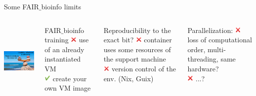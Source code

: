 \begin{frame}{Some FAIR$\_$bioinfo limits}
\begin{columns}
\begin{center}
    \includegraphics[height=3.8cm]{09_conclusion/images/FAIR_equilibre.png}
\end{center}
\begin{block}{FAIR$\_$bioinfo training}
\includegraphics[height=0.3cm]{05_history/Images/FAIR_no.png} use of an already instantiated VM\\
\includegraphics[height=0.3cm]{05_history/Images/FAIR_yes.png} create your own VM image
\end{block}
\begin{block}{Reproducibility to the exact bit?}
\includegraphics[height=0.3cm]{05_history/Images/FAIR_no.png} container uses some resources of the support machine\\
\includegraphics[height=0.3cm]{05_history/Images/FAIR_no.png} version control of the env. (Nix, Guix)
\end{block}
\begin{block}{Parallelization:}
\includegraphics[height=0.3cm]{05_history/Images/FAIR_no.png} loss of computational order, multi-threading, same hardware?\\
\includegraphics[height=0.3cm]{05_history/Images/FAIR_no.png}
...?
\end{block}
\end{columns}
\end{frame}

